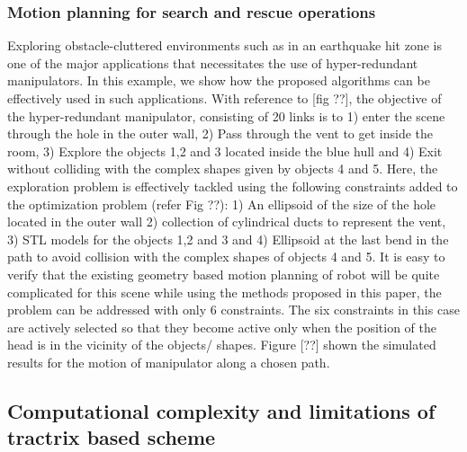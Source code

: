 \documentclass[12pt,a4]{article}
\begin{document}
\subsubsection{Motion planning for search and rescue operations}
Exploring obstacle-cluttered environments such as in an earthquake hit zone is one of the major applications that necessitates the use of hyper-redundant manipulators. In this example, we show how the proposed algorithms can be effectively used in such applications. With reference to [fig ??], the objective of the hyper-redundant manipulator, consisting of 20 links is to 1) enter the scene through the hole in the outer wall, 2) Pass through the vent to get inside the room, 3) Explore the objects 1,2 and 3 located inside the blue hull and 4) Exit without colliding with the complex shapes given by objects 4 and 5. Here, the exploration problem is effectively tackled using the following constraints added to the optimization problem (refer Fig ??): 1) An ellipsoid of the size of the hole located in the outer wall 2) collection of cylindrical ducts to represent the vent, 3) STL models for the objects 1,2 and 3 and 4) Ellipsoid at the last bend in the path to avoid collision with the complex shapes of objects 4 and 5. It is easy to verify that the existing geometry based motion planning of robot will be quite complicated for this scene while using the methods proposed in this paper, the problem can be addressed with only 6 constraints. The six constraints in this case are actively selected so that they become active only when the position of the head is in the vicinity of the objects/ shapes. Figure [??] shown the simulated results for the motion of manipulator along a chosen path. 

\subsection{Computational complexity and limitations of tractrix based scheme}
\end{document}
